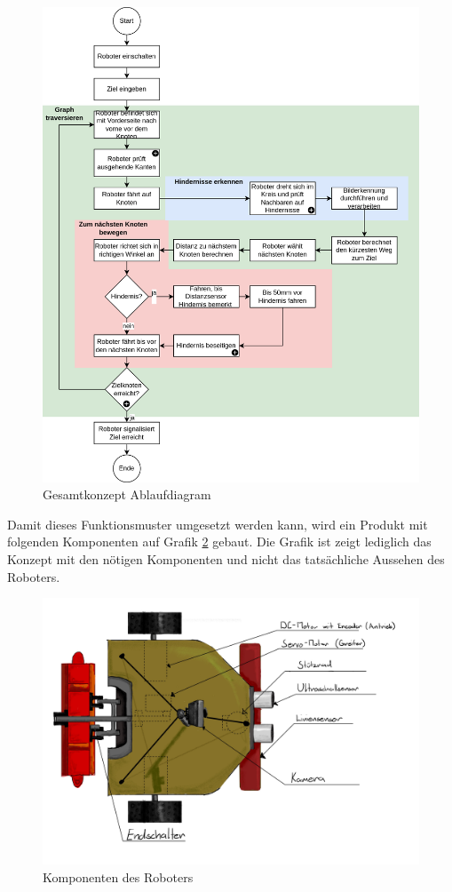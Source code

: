 \begin{figure}[H]
\centering
\includegraphics[width=\textwidth]{assets/gesamtkonzept/ablaufdiagramm.png}
\caption{Gesamtkonzept Ablaufdiagram}
\label{fig:ablauf}
\end{figure}

Damit dieses Funktionsmuster umgesetzt werden kann, wird ein Produkt mit folgenden Komponenten auf Grafik \ref{fig:components} gebaut. Die Grafik ist zeigt lediglich das Konzept mit den nötigen Komponenten und nicht das tatsächliche Aussehen des Roboters.

\begin{figure}[H]
\centering
\includegraphics[width=\textwidth]{assets/gesamtkonzept/Skizze-Fahrzeugkonzept-Beschriftet.jpg}
\caption{Komponenten des Roboters}
\label{fig:components}
\end{figure}

